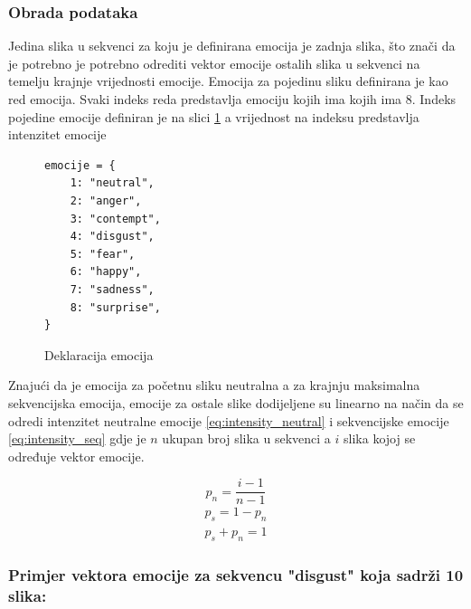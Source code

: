 \documentclass[times, utf8, zavrsni,numeric]{fer}
\begin{document}
\subsubsection{Obrada podataka}
Jedina slika u sekvenci za koju je definirana emocija je zadnja slika, što znači da je potrebno je potrebno odrediti vektor emocije ostalih slika u sekvenci na temelju krajnje vrijednosti emocije. Emocija za pojedinu sliku definirana je kao red emocija. Svaki indeks reda predstavlja emociju kojih ima kojih ima 8. Indeks pojedine emocije definiran je na slici \ref{cb:emo_declare} a vrijednost na indeksu predstavlja intenzitet emocije

\begin{figure}[H]
\centering
\begin{Verbatim}[fontsize=\small]
emocije = {
    1: "neutral",
    2: "anger",
    3: "contempt",
    4: "disgust",
    5: "fear",
    6: "happy",
    7: "sadness",
    8: "surprise",
}
\end{Verbatim}
\caption{Deklaracija emocija}
\label{cb:emo_declare}
\end{figure}

\noindent
Znajući da je emocija za početnu sliku neutralna a za krajnju maksimalna sekvencijska emocija, emocije za ostale slike dodijeljene su linearno na način da se odredi intenzitet neutralne emocije \ref{eq:intensity_neutral} i sekvencijske emocije \ref{eq:intensity_seq} gdje je $n$ ukupan broj slika u sekvenci a $i$ slika kojoj se određuje vektor emocije.

\begin{equation}\label{eq:intensity_neutral}
	p_{n} = \dfrac{i-1}{n-1}	
\end{equation}
\begin{equation}\label{eq:intensity_seq}
\begin{split}
	p_{s} = 1 - p_{n}\\
	p_{s} + p_{n} = 1	
\end{split}
\end{equation}

\subsubsection{Primjer vektora emocije za sekvencu "disgust" koja sadrži 10 slika:}
\end{document}
